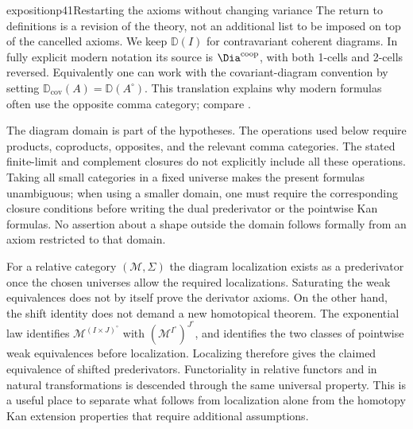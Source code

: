\begin{dcomment}{exposition}{p41}{Restarting the axioms without changing variance}
The return to definitions is a revision of the theory, not an additional
list to be imposed on top of the cancelled axioms. We keep
$\mathbb D(I)$ for contravariant coherent diagrams. In fully explicit
modern notation its source is $\Dia^{\mathrm{coop}}$, with both
1-cells and 2-cells reversed. Equivalently one can work with the
covariant-diagram convention by setting
$\mathbb D_{\mathrm{cov}}(A)=\mathbb D(A^{\circ})$. This translation
explains why modern formulas often use the opposite comma category;
compare \citet[Warning~2.2]{GrothPontoShulman2014}.

The diagram domain is part of the hypotheses. The operations used below
require products, coproducts, opposites, and the relevant comma
categories. The stated finite-limit and complement closures do not
explicitly include all these operations. Taking all small categories
in a fixed universe makes the present formulas unambiguous; when using
a smaller domain, one must require the corresponding closure conditions
before writing the dual prederivator or the pointwise Kan formulas.
No assertion about a shape outside the domain follows formally from an
axiom restricted to that domain.

For a relative category $(\mathcal M,\Sigma)$ the diagram localization
exists as a prederivator once the chosen universes allow the required
localizations. Saturating the weak equivalences does not by itself
prove the derivator axioms. On the other hand, the shift identity does
not demand a new homotopical theorem. The exponential law identifies
$\mathcal M^{(I\times J)^{\circ}}$ with
$(\mathcal M^{I^{\circ}})^{J^{\circ}}$, and identifies the two
classes of pointwise weak equivalences before localization. Localizing
therefore gives the claimed equivalence of shifted prederivators.
Functoriality in relative functors and in natural transformations is
descended through the same universal property. This is a useful place
to separate what follows from localization alone from the homotopy Kan
extension properties that require additional assumptions.
\end{dcomment}

